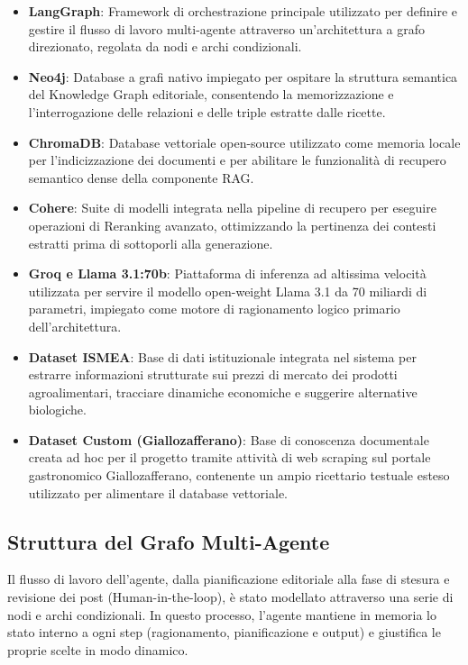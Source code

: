 \documentclass[11pt, a4paper]{article}
\begin{document}
\begin{itemize}
    \item \textbf{LangGraph}: Framework di orchestrazione principale utilizzato per definire e gestire il flusso di lavoro multi-agente attraverso un'architettura a grafo direzionato, regolata da nodi e archi condizionali.
    \item \textbf{Neo4j}: Database a grafi nativo impiegato per ospitare la struttura semantica del Knowledge Graph editoriale, consentendo la memorizzazione e l'interrogazione delle relazioni e delle triple estratte dalle ricette.
    \item \textbf{ChromaDB}: Database vettoriale open-source utilizzato come memoria locale per l'indicizzazione dei documenti e per abilitare le funzionalità di recupero semantico dense della componente RAG.
    \item \textbf{Cohere}: Suite di modelli integrata nella pipeline di recupero per eseguire operazioni di Reranking avanzato, ottimizzando la pertinenza dei contesti estratti prima di sottoporli alla generazione.
    \item \textbf{Groq e Llama 3.1:70b}: Piattaforma di inferenza ad altissima velocità utilizzata per servire il modello open-weight Llama 3.1 da 70 miliardi di parametri, impiegato come motore di ragionamento logico primario dell'architettura.
    \item \textbf{Dataset ISMEA}: Base di dati istituzionale integrata nel sistema per estrarre informazioni strutturate sui prezzi di mercato dei prodotti agroalimentari, tracciare dinamiche economiche e suggerire alternative biologiche.
    \item \textbf{Dataset Custom (Giallozafferano)}: Base di conoscenza documentale creata ad hoc per il progetto tramite attività di web scraping sul portale gastronomico Giallozafferano, contenente un ampio ricettario testuale esteso utilizzato per alimentare il database vettoriale.
\end{itemize}

\subsection{Struttura del Grafo Multi-Agente}

Il flusso di lavoro dell'agente, dalla pianificazione editoriale alla fase di stesura e revisione dei post (Human-in-the-loop), è stato modellato attraverso una serie di nodi e archi condizionali. In questo processo, l'agente mantiene in memoria lo stato interno a ogni step (ragionamento, pianificazione e output) e giustifica le proprie scelte in modo dinamico.
\end{document}
